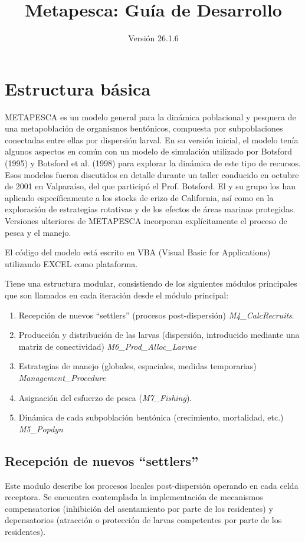 \documentclass[12pt, oneside, a4paper]{article}
\title{Metapesca: Guía de Desarrollo}
\author{Versión 26.1.6}
\begin{document}
\maketitle

	\section{Estructura básica}

		METAPESCA es un modelo general para la dinámica poblacional y pesquera de una metapoblación de organismos bentónicos, compuesta por subpoblaciones conectadas entre ellas por dispersión larval. En su versión inicial, el modelo tenía algunos aspectos en común con un modelo de simulación utilizado por Botsford (1995) y Botsford et al. (1998) para explorar la dinámica de este tipo de recursos. Esos modelos fueron discutidos en detalle durante un taller conducido en octubre de 2001 en Valparaíso, del que participó el Prof. Botsford. El y su grupo los han aplicado específicamente a los stocks de erizo de California, así como en la exploración de estrategias rotativas y de los efectos de áreas marinas protegidas. Versiones ulteriores de METAPESCA incorporan explícitamente el proceso de pesca y el manejo.
		
		
		El código del modelo está escrito en VBA (Visual Basic for Applications) utilizando EXCEL como plataforma. 

		Tiene una estructura modular, consistiendo de los siguientes módulos principales que son llamados en cada iteración desde el módulo principal:

			\begin{enumerate}
				\item Recepción de nuevos “settlers” (procesos post-dispersión) \emph{M4\_CalcRecruits}.
				\item Producción y distribución de las larvas (dispersión, introducido mediante una matriz de conectividad) \emph{M6\_Prod\_Alloc\_Larvae}
				\item Estrategias de manejo (globales, espaciales, medidas temporarias) \emph{Management\_Procedure}
				\item Asignación del esfuerzo de pesca (\emph{M7\_Fishing}).						
				\item Dinámica de cada subpoblación bentónica (crecimiento, mortalidad, etc.) \emph{M5\_Popdyn}

			\end{enumerate}

		\subsection {Recepción de nuevos “settlers”}
			Este modulo describe los procesos locales post-dispersión operando en cada celda receptora. Se encuentra contemplada la implementación de mecanismos compensatorios (inhibición del asentamiento por parte de los residentes) y depensatorios (atracción o protección de larvas competentes por parte de los residentes).
\end{document}
